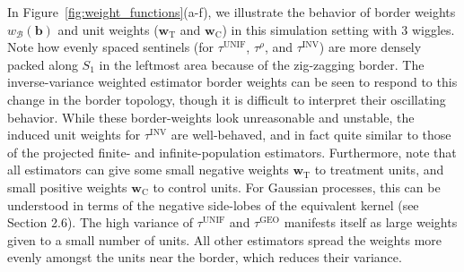 \documentclass[letter]{article}
\newcommand{\treat}{\mathrm{T}}
\newcommand{\ctrol}{\mathrm{C}}
\newcommand{\wvec}{\mathbold{w}}
\newcommand{\border}{\mathcal{B}}
\newcommand{\sentinel}{\bm{b}}
\newcommand{\unifavg}{\tau^{\mathrm{UNIF}}}
\newcommand{\invvar}{\tau^{\mathrm{INV}}}
\newcommand{\taurho}{\tau^{\rho}}
\newcommand{\taugeo}{\tau^{\mathrm{GEO}}}
\newcommand{\weightb}{w_{\border}}
\newcommand{\wt}{\wvec_{\treat}}
\newcommand{\wc}{\wvec_{\ctrol}}
\renewcommand{\cite}[1]{\citet{#1}}
\begin{document}
    	In Figure~\ref{fig:weight_functions}(a-f), we illustrate the behavior of border weights \(\weightb(\sentinel)\) and unit weights (\(\wt\) and \(\wc\)) in this simulation setting with 3 wiggles.
Note how evenly spaced sentinels (for \(\unifavg\), \(\taurho\), and \(\invvar\)) are more densely packed along \(S_1\) in the leftmost area because of the zig-zagging border.
The inverse-variance weighted estimator border weights can be seen to respond to this change in the border topology, though it is difficult to interpret their oscillating behavior.
While these border-weights look unreasonable and unstable, the induced unit weights for \(\invvar\) are well-behaved, and in fact quite similar to those of the projected finite- and infinite-population estimators.
Furthermore, note that all estimators can give some small negative weights \(\wt\) to treatment units, and small positive weights \(\wc\) to control units.
For Gaussian processes, this can be understood in terms of the negative side-lobes of the equivalent kernel (see \cite{rasmussen2006gaussian} Section 2.6).
The high variance of \(\unifavg\) and \(\taugeo\) manifests itself as large weights given to a small number of units.
All other estimators spread the weights more evenly amongst the units near the border, which reduces their variance.
    
\end{document}
